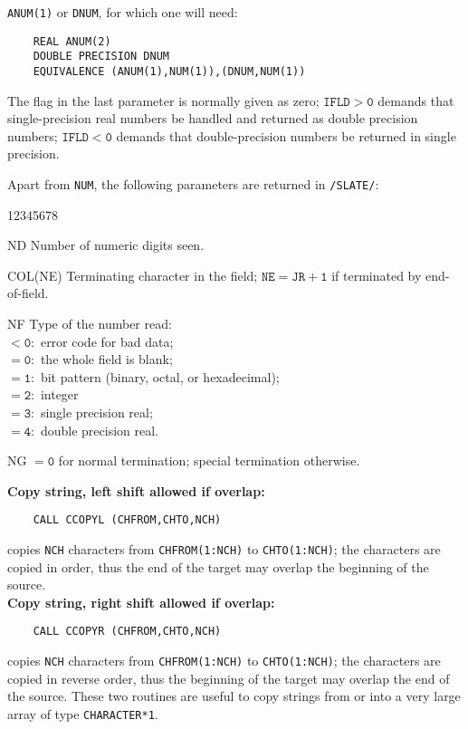 {\tt ANUM(1)} or {\tt DNUM}, for which one will need:
\begin{verbatim}
    REAL ANUM(2)
    DOUBLE PRECISION DNUM
    EQUIVALENCE (ANUM(1),NUM(1)),(DNUM,NUM(1))
\end{verbatim}
\par
The flag in the last parameter is normally given as zero;
$\mathtt{IFLD > 0}$ demands that single-precision real numbers be handled
and returned as double precision numbers;
$\mathtt{IFLD < 0}$ demands that double-precision numbers be
returned in single precision.
\par
Apart from {\tt NUM}, the following parameters are returned in
{\tt /SLATE/}:
\begin{DLtt}{12345678}
\item [ND] Number of numeric digits seen.
\item[COL(NE)] Terminating character in the field; $\mathtt{NE=JR+1}$ if
terminated by end-of-field.
\item [NF] Type of the number read:\\
$\mathtt{<0:}$ error code for bad data;\\
$\mathtt{=0:}$ the whole field is blank;\\
$\mathtt{=1:}$ bit pattern (binary, octal, or hexadecimal);\\
$\mathtt{=2:}$ integer\\
$\mathtt{=3:}$ single precision real;\\
$\mathtt{=4:}$ double precision real.
\item[NG] $\mathtt{=0}$ for normal termination; special termination
otherwise.
\end{DLtt}
{\bf Copy string, left shift allowed if overlap:}
\begin{verbatim}
    CALL CCOPYL (CHFROM,CHTO,NCH)
\end{verbatim}
copies {\tt NCH} characters from {\tt CHFROM(1:NCH)} to
{\tt CHTO(1:NCH)}; the characters are copied in order, thus the end of
the target may overlap the beginning of the source. \\[2mm]
{\bf Copy string, right shift allowed if overlap:}
\begin{verbatim}
    CALL CCOPYR (CHFROM,CHTO,NCH)
\end{verbatim}
copies {\tt NCH} characters from {\tt CHFROM(1:NCH)} to
{\tt CHTO(1:NCH)}; the characters are copied in reverse order,
thus the beginning of the target may overlap the end of the source.
These two routines are useful to copy strings from or into a
very large array of type {\tt CHARACTER*1}. \\[2mm]
